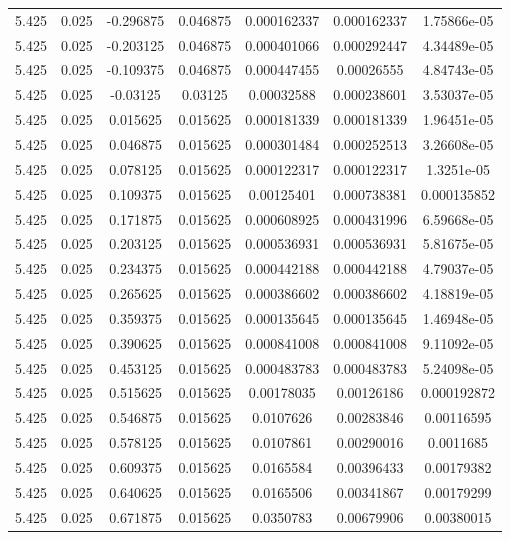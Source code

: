 \begin{table}[bh]
\begin{center}
{\begin{tabular}{ccccccc}
5.425	 & 0.025 & 	-0.296875	 & 0.046875	 & 0.000162337	 & 0.000162337	 & 1.75866e-05 \\ 
5.425	 & 0.025 & 	-0.203125	 & 0.046875	 & 0.000401066	 & 0.000292447	 & 4.34489e-05 \\ 
5.425	 & 0.025 & 	-0.109375	 & 0.046875	 & 0.000447455	 & 0.00026555	 & 4.84743e-05 \\ 
5.425	 & 0.025 & 	-0.03125	 & 0.03125	 & 0.00032588	 & 0.000238601	 & 3.53037e-05 \\ 
5.425	 & 0.025 & 	0.015625	 & 0.015625	 & 0.000181339	 & 0.000181339	 & 1.96451e-05 \\ 
5.425	 & 0.025 & 	0.046875	 & 0.015625	 & 0.000301484	 & 0.000252513	 & 3.26608e-05 \\ 
5.425	 & 0.025 & 	0.078125	 & 0.015625	 & 0.000122317	 & 0.000122317	 & 1.3251e-05 \\ 
5.425	 & 0.025 & 	0.109375	 & 0.015625	 & 0.00125401	 & 0.000738381	 & 0.000135852 \\ 
5.425	 & 0.025 & 	0.171875	 & 0.015625	 & 0.000608925	 & 0.000431996	 & 6.59668e-05 \\ 
5.425	 & 0.025 & 	0.203125	 & 0.015625	 & 0.000536931	 & 0.000536931	 & 5.81675e-05 \\ 
5.425	 & 0.025 & 	0.234375	 & 0.015625	 & 0.000442188	 & 0.000442188	 & 4.79037e-05 \\ 
5.425	 & 0.025 & 	0.265625	 & 0.015625	 & 0.000386602	 & 0.000386602	 & 4.18819e-05 \\ 
5.425	 & 0.025 & 	0.359375	 & 0.015625	 & 0.000135645	 & 0.000135645	 & 1.46948e-05 \\ 
5.425	 & 0.025 & 	0.390625	 & 0.015625	 & 0.000841008	 & 0.000841008	 & 9.11092e-05 \\ 
5.425	 & 0.025 & 	0.453125	 & 0.015625	 & 0.000483783	 & 0.000483783	 & 5.24098e-05 \\ 
5.425	 & 0.025 & 	0.515625	 & 0.015625	 & 0.00178035	 & 0.00126186	 & 0.000192872 \\ 
5.425	 & 0.025 & 	0.546875	 & 0.015625	 & 0.0107626	 & 0.00283846	 & 0.00116595 \\ 
5.425	 & 0.025 & 	0.578125	 & 0.015625	 & 0.0107861	 & 0.00290016	 & 0.0011685 \\ 
5.425	 & 0.025 & 	0.609375	 & 0.015625	 & 0.0165584	 & 0.00396433	 & 0.00179382 \\ 
5.425	 & 0.025 & 	0.640625	 & 0.015625	 & 0.0165506	 & 0.00341867	 & 0.00179299 \\ 
5.425	 & 0.025 & 	0.671875	 & 0.015625	 & 0.0350783	 & 0.00679906	 & 0.00380015 \\ 

\end{tabular}}
\end{center}
\end{table}
